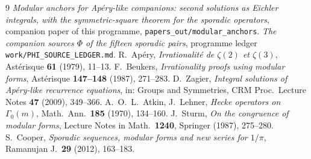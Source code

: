 \documentclass[11pt,reqno]{amsart}
\theoremstyle{plain}
\theoremstyle{definition}
\theoremstyle{remark}
\begin{document}
\begin{thebibliography}{9}
 \emph{Modular anchors for Ap\'ery-like companions:
second solutions as Eichler integrals, with the symmetric-square theorem
for the sporadic operators}, companion paper of this programme,
\texttt{papers\_out/modular\_anchors}.
 \emph{The companion sources $\Phi$ of the fifteen
sporadic pairs}, programme ledger \texttt{work/PHI\_SOURCE\_LEDGER.md}.
 R.~Ap\'ery, \emph{Irrationalit\'e de $\zeta(2)$ et
$\zeta(3)$}, Ast\'erisque \textbf{61} (1979), 11--13.
 F.~Beukers, \emph{Irrationality proofs using modular
forms}, Ast\'erisque \textbf{147--148} (1987), 271--283.
 D.~Zagier, \emph{Integral solutions of Ap\'ery-like
recurrence equations}, in: Groups and Symmetries, CRM Proc.\ Lecture Notes
\textbf{47} (2009), 349--366.
 A.~O.~L.~Atkin, J.~Lehner, \emph{Hecke operators on
$\Gamma_0(m)$}, Math.\ Ann.\ \textbf{185} (1970), 134--160.
 J.~Sturm, \emph{On the congruence of modular forms},
Lecture Notes in Math.\ \textbf{1240}, Springer (1987), 275--280.
 S.~Cooper, \emph{Sporadic sequences, modular forms and
new series for $1/\pi$}, Ramanujan J.\ \textbf{29} (2012), 163--183.
\end{thebibliography}
\end{document}

